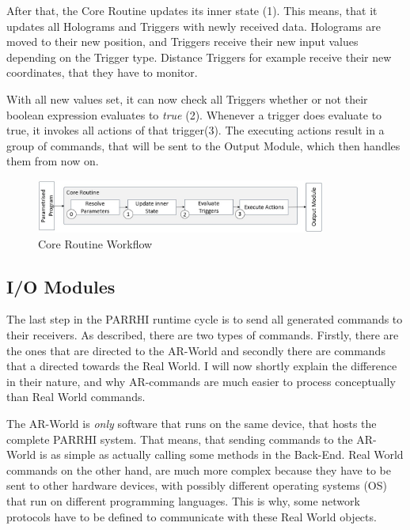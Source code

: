 After that, the Core Routine updates its inner state (1). This means, that it updates all Holograms and Triggers with newly received data. Holograms are moved to their new position, and Triggers receive their new input values depending on the Trigger type. Distance Triggers for example receive their new coordinates, that they have to monitor.

With all new values set, it can now check all Triggers whether or not their boolean expression evaluates to \textit{true} (2). Whenever a trigger does evaluate to true, it invokes all actions of that trigger(3). The executing actions result in a group of commands, that will be sent to the Output Module, which then handles them from now on. 

\begin{figure}[!h]
	\centering
	\includegraphics[width=0.85\textwidth]{Figures/CoreRoutine.jpg}
	\caption{Core Routine Workflow}
	\label{Fig:CoreRoutine}
\end{figure}

\subsection{I/O Modules}

The last step in the PARRHI runtime cycle is to send all generated commands to their receivers. As described, there are two types of commands. Firstly, there are the ones that are directed to the AR-World and secondly there are commands that a directed towards the Real World. I will now shortly explain the difference in their nature, and why AR-commands are much easier to process conceptually than Real World commands.

The AR-World is \textit{only} software that runs on the same device, that hosts the complete PARRHI system. That means, that sending commands to the AR-World is as simple as actually calling some methods in the Back-End. Real World commands on the other hand, are much more complex because they have to be sent to other hardware devices, with possibly different operating systems (OS) that run on different programming languages. This is why, some network protocols have to be defined to communicate with these Real World objects. 

